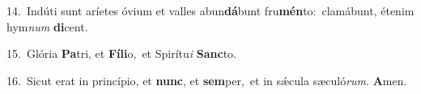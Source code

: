 {\numbfont\textcolor{\numbcolor}{14.}}~Indúti sunt aríetes óvium et valles abun\-\textbf{dá}\-bunt fru\-\textbf{mén}\-to:~\star clamábunt, étenim hym\textit{num} \textbf{di}\-cent.\par
{\numbfont\textcolor{\numbcolor}{15.}}~Glória \textbf{Pa}\-tri, et \textbf{Fí}\-\textbf{li}o,~\star et Spirítu\textit{i} \textbf{Sanc}\-to.\par
{\numbfont\textcolor{\numbcolor}{16.}}~Sicut erat in princípio, et \textbf{nunc}\-, et \textbf{sem}\-per,~\star et in sǽcula sæculó\-\textit{rum}\-. \textbf{A}\-men.\par
